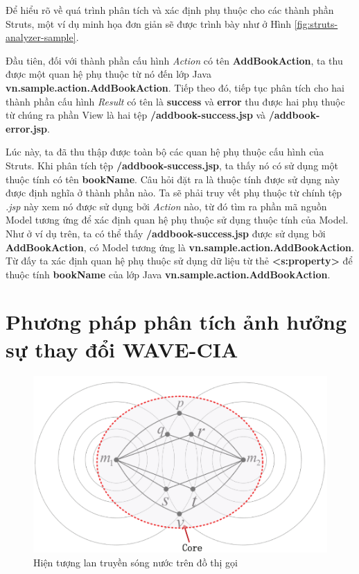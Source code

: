 \documentclass[12pt]{report}
\begin{document}
Để hiểu rõ về quá trình phân tích và xác định phụ thuộc cho các thành phần Struts, một ví dụ minh họa đơn giản sẽ được trình bày như ở Hình \ref{fig:struts-analyzer-sample}.

Đầu tiên, đối với thành phần cấu hình \textit{Action} có tên \textbf{AddBookAction}, ta thu được một quan hệ phụ thuộc từ nó đến lớp Java \textbf{vn.sample.action.AddBookAction}. Tiếp theo đó, tiếp tục phân tích cho hai thành phần cấu hình \textit{Result} có tên là \textbf{success} và \textbf{error} thu được hai phụ thuộc từ chúng ra phần View là hai tệp \textbf{/addbook-success.jsp} và \textbf{/addbook-error.jsp}.

Lúc này, ta đã thu thập được toàn bộ các quan hệ phụ thuộc cấu hình của Struts. Khi phân tích tệp \textbf{/addbook-success.jsp}, ta thấy nó có sử dụng một thuộc tính có tên \textbf{bookName}. Câu hỏi đặt ra là thuộc tính được sử dụng này được định nghĩa ở thành phần nào. Ta sẽ phải truy vết phụ thuộc từ chính tệp \textit{.jsp} này xem nó được sử dụng bởi \textit{Action} nào, từ đó tìm ra phần mã nguồn Model tương ứng để xác định quan hệ phụ thuộc sử dụng thuộc tính của Model. Như ở ví dụ trên, ta có thể thấy \textbf{/addbook-success.jsp} được sử dụng bởi \textbf{AddBookAction}, có Model tương ứng là \textbf{vn.sample.action.AddBookAction}. Từ đấy ta xác định quan hệ phụ thuộc sử dụng dữ liệu từ thẻ \textbf{<s:property>} để thuộc tính \textbf{bookName} của lớp Java \textbf{vn.sample.action.AddBookAction}.

\section{Phương pháp phân tích ảnh hưởng sự thay đổi WAVE-CIA}

\begin{figure}[h]
	\centering
	\includegraphics[scale=0.45]{wave-cia-phenomenon}
	\caption{Hiện tượng lan truyền sóng nước trên đồ thị gọi}
	\label{wave-cia-phenomenon}	
\end{figure}
\end{document}
